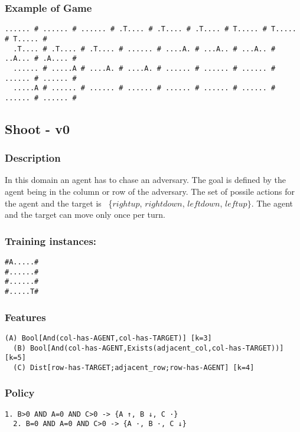 \documentclass[a4paper]{article}
\begin{document}
\subsubsection{Example of Game}
\begin{Verbatim}[fontsize=\footnotesize]
  ...... # ...... # ...... # .T.... # .T.... # .T.... # T..... # T..... # T..... #
  .T.... # .T.... # .T.... # ...... # ....A. # ...A.. # ...A.. # ..A... # .A.... #
  ...... # .....A # ....A. # ....A. # ...... # ...... # ...... # ...... # ...... #
  .....A # ...... # ...... # ...... # ...... # ...... # ...... # ...... # ...... #
\end{Verbatim}



\subsection{Shoot - v0}
\subsubsection{Description}
In this domain an agent has to chase an adversary. The goal is defined by the agent being in the column or row of the adversary. The set of possile actions for the agent and the target is ~\{$rightup$, $rightdown$, $leftdown$, $leftup\}$.  The agent and the target can move only once per turn.

\subsubsection{Training instances:}
\begin{Verbatim}[fontsize=\footnotesize]
#A.....#
#......#
#......#
#.....T#
\end{Verbatim}

\subsubsection{Features}
\begin{Verbatim}[fontsize=\footnotesize]
  (A) Bool[And(col-has-AGENT,col-has-TARGET)] [k=3]
  (B) Bool[And(col-has-AGENT,Exists(adjacent_col,col-has-TARGET))] [k=5]
  (C) Dist[row-has-TARGET;adjacent_row;row-has-AGENT] [k=4]

\end{Verbatim}

\subsubsection{Policy}
\begin{Verbatim}[fontsize=\footnotesize]
  1. B>0 AND A=0 AND C>0 -> {A ↑, B ↓, C ·}
  2. B=0 AND A=0 AND C>0 -> {A ·, B ·, C ↓}
\end{Verbatim}
\end{document}
